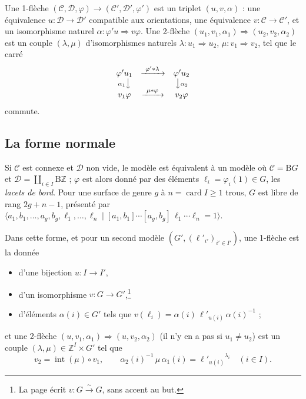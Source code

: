 \documentclass[11pt,a4paper]{article}
\begin{document}
Une 1-flèche $(\mathcal{C}, \mathcal{D}, \varphi) \to (\mathcal{C}',
\mathcal{D}', \varphi')$ est un triplet $(u, v, \alpha)$ : une équivalence
$u : \mathcal{D} \to \mathcal{D}'$ compatible aux orientations, une
équivalence $v : \mathcal{C} \to \mathcal{C}'$, et un isomorphisme naturel
$\alpha : \varphi' u \Rightarrow v \varphi$. Une 2-flèche
$(u_1, v_1, \alpha_1) \Rightarrow (u_2, v_2, \alpha_2)$ est un couple
$(\lambda, \mu)$ d'isomorphismes naturels $\lambda : u_1 \Rightarrow u_2$,
$\mu : v_1 \Rightarrow v_2$, tel que le carré
\[
  \begin{array}{ccc}
    \varphi' u_1 & \xrightarrow{\ \varphi' \ast \lambda\ } & \varphi' u_2 \\
    {\scriptstyle \alpha_1} \big\downarrow & & \big\downarrow {\scriptstyle \alpha_2} \\
    v_1 \varphi & \xrightarrow{\ \mu \ast \varphi\ } & v_2 \varphi
  \end{array}
\]
commute.

\subsection*{La forme normale}

Si $\mathcal{C}$ est connexe et $\mathcal{D}$ non vide, le modèle est
équivalent à un modèle où $\mathcal{C} = \mathrm{B}G$ et
$\mathcal{D} = \coprod_{i \in I} \mathrm{B}\mathbb{Z}$ ; $\varphi$ est alors
donné par des éléments $\ell_i = \varphi_i(1) \in G$, les \emph{lacets de
bord}. Pour une surface de genre $g$ à $n = \operatorname{card} I \geqslant 1$
trous, $G$ est libre de rang $2g + n - 1$, présenté par
$\langle a_1, b_1, \dots, a_g, b_g, \ell_1, \dots, \ell_n \mid
[a_1, b_1] \cdots [a_g, b_g]\, \ell_1 \cdots \ell_n = 1 \rangle$.

Dans cette forme, et pour un second modèle $(G', (\ell'_{i'})_{i' \in I'})$,
une 1-flèche est la donnée
\begin{itemize}
\item d'une bijection $u : I \to I'$,
\item d'un isomorphisme $v : G \to G'$,\footnote{La page écrit
$v : G \xrightarrow{\sim} G$, sans accent au but.}
\item d'éléments $\alpha(i) \in G'$ tels que $v(\ell_i) = \alpha(i)\,
\ell'_{u(i)}\, \alpha(i)^{-1}$ ;
\end{itemize}
et une 2-flèche $(u, v_1, \alpha_1) \Rightarrow (u, v_2, \alpha_2)$ (il n'y
en a pas si $u_1 \neq u_2$) est un couple $(\lambda, \mu) \in \mathbb{Z}^I
\times G'$ tel que
\[
  v_2 = \operatorname{int}(\mu) \circ v_1 , \qquad
  \alpha_2(i)^{-1}\, \mu\, \alpha_1(i) = {\ell'_{u(i)}}^{\lambda_i}
  \quad (i \in I).
\]
\end{document}

